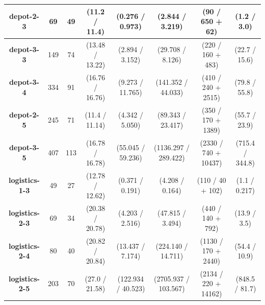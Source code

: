 \documentclass[letterpaper]{article} %
\theoremstyle{remark}
\begin{document}
\begin{table}[]
\begin{tabular}{|c|c|c||c|c|c|c|c|}
\textbf{depot-2-3}     & 69                  & 49                & (11.2 / 11.4)      & (0.276 / 0.973)                             & (2.844 / 3.219)                           & (90 / 650 + 62)               & (1.2 / 3.0)               \\ \hline
\textbf{depot-3-3}     & 149                 & 74                & (13.48 / 13.22)    & (2.894 / 3.152)                             & (29.708 / 8.126)                          & (220 / 160 + 483)              & (22.7 / 15.6)             \\ \hline
\textbf{depot-3-4}     & 334                 & 91                & (16.76 / 16.76)    & (9.273 / 11.765)                            & (141.352 / 44.033)                        & (410 / 240 + 2515)              & (79.8 / 55.8)             \\ \hline
\textbf{depot-2-5}     & 245                 & 71                & (11.4 / 11.14)     & (4.342 / 5.050)                             & (89.343 / 23.417)                         & (350 / 170 + 1389)              & (55.7 / 23.9)             \\ \hline
\textbf{depot-3-5}     & 407                 & 113               & (16.78 / 16.78)    & (55.045 / 59.236)                           & (1136.297 / 289.422)                      & (2330 / 740 + 10437)             & (715.4 / 344.8)           \\ \hline\hline
\textbf{logistics-1-3} & 49                  & 27                & (12.78 / 12.62)    & (0.371 / 0.191)                             & (4.208 / 0.164)                           & (110 / 40 + 102)               & (1.1 / 0.217)             \\ \hline
\textbf{logistics-2-3} & 69                  & 34                & (20.38 / 20.78)    & (4.203 / 2.516)                             & (47.815 / 3.494)                          & (440 / 140 + 792)              & (13.9 / 3.5)              \\ \hline
\textbf{logistics-2-4} & 80                  & 40                & (20.82 / 20.84)    & (13.437 / 7.174)                            & (224.140 / 14.711)                        & (1130 / 170 + 2440)             & (54.4 / 10.9)             \\ \hline
\textbf{logistics-2-5} & 203                 & 70                & (27.0 / 21.58)     & (122.934 / 40.523)                          & (2705.937 / 103.567)                      & (2134 / 220 + 14162)             & (848.5 / 81.7)            \\ \hline

\end{tabular}
\end{table}
\end{document}
